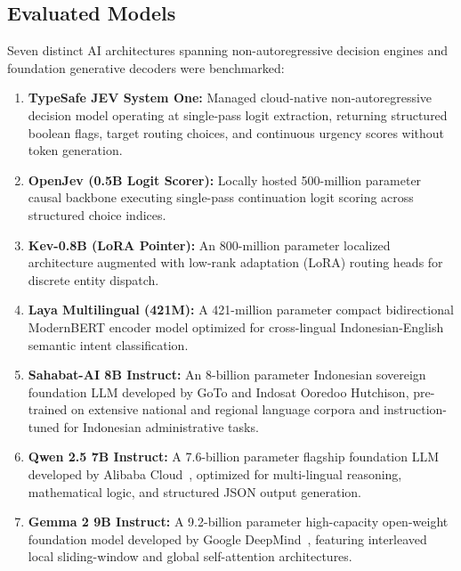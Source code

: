 \documentclass[journal,compsoc]{IEEEtran}
\begin{document}
\subsection{Evaluated Models}
Seven distinct AI architectures spanning non-autoregressive decision engines and foundation generative decoders were benchmarked:
\begin{enumerate}
    \item \textbf{TypeSafe JEV System One:} Managed cloud-native non-autoregressive decision model operating at single-pass logit extraction, returning structured boolean flags, target routing choices, and continuous urgency scores without token generation.
    \item \textbf{OpenJev (0.5B Logit Scorer):} Locally hosted 500-million parameter causal backbone executing single-pass continuation logit scoring across structured choice indices.
    \item \textbf{Kev-0.8B (LoRA Pointer):} An 800-million parameter localized architecture augmented with low-rank adaptation (LoRA) routing heads for discrete entity dispatch.
    \item \textbf{Laya Multilingual (421M):} A 421-million parameter compact bidirectional ModernBERT encoder model optimized for cross-lingual Indonesian-English semantic intent classification.
    \item \textbf{Sahabat-AI 8B Instruct:} An 8-billion parameter Indonesian sovereign foundation LLM developed by GoTo and Indosat Ooredoo Hutchison, pre-trained on extensive national and regional language corpora and instruction-tuned for Indonesian administrative tasks.
    \item \textbf{Qwen 2.5 7B Instruct:} A 7.6-billion parameter flagship foundation LLM developed by Alibaba Cloud~\cite{qwen2024}, optimized for multi-lingual reasoning, mathematical logic, and structured JSON output generation.
    \item \textbf{Gemma 2 9B Instruct:} A 9.2-billion parameter high-capacity open-weight foundation model developed by Google DeepMind~\cite{gemma2024}, featuring interleaved local sliding-window and global self-attention architectures.
\end{enumerate}
\end{document}
